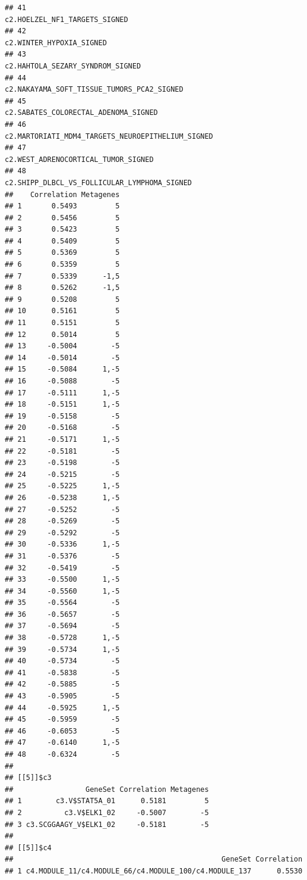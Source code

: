 \documentclass{article}\usepackage[]{graphicx}\usepackage[]{color}
\makeatletter
\newenvironment{kframe}{%
 \def\at@end@of@kframe{}%
 \ifinner\ifhmode%
  \def\at@end@of@kframe{\end{minipage}}%
  \begin{minipage}{\columnwidth}%
 \fi\fi%
 \def\FrameCommand##1{\hskip\@totalleftmargin \hskip-\fboxsep
 \colorbox{shadecolor}{##1}\hskip-\fboxsep
     \hskip-\linewidth \hskip-\@totalleftmargin \hskip\columnwidth}%
 \MakeFramed {\advance\hsize-\width
   \@totalleftmargin\z@ \linewidth\hsize
   \@setminipage}}%
 {\par\unskip\endMakeFramed%
 \at@end@of@kframe}
\newenvironment{knitrout}{}{} %
\makeatother
\begin{document}
\begin{knitrout}
\begin{kframe}
\begin{verbatim}
## 41                                                                               c2.HOELZEL_NF1_TARGETS_SIGNED
## 42                                                                                    c2.WINTER_HYPOXIA_SIGNED
## 43                                                                            c2.HAHTOLA_SEZARY_SYNDROM_SIGNED
## 44                                                                  c2.NAKAYAMA_SOFT_TISSUE_TUMORS_PCA2_SIGNED
## 45                                                                        c2.SABATES_COLORECTAL_ADENOMA_SIGNED
## 46                                                           c2.MARTORIATI_MDM4_TARGETS_NEUROEPITHELIUM_SIGNED
## 47                                                                         c2.WEST_ADRENOCORTICAL_TUMOR_SIGNED
## 48                                                                c2.SHIPP_DLBCL_VS_FOLLICULAR_LYMPHOMA_SIGNED
##    Correlation Metagenes
## 1       0.5493         5
## 2       0.5456         5
## 3       0.5423         5
## 4       0.5409         5
## 5       0.5369         5
## 6       0.5359         5
## 7       0.5339      -1,5
## 8       0.5262      -1,5
## 9       0.5208         5
## 10      0.5161         5
## 11      0.5151         5
## 12      0.5014         5
## 13     -0.5004        -5
## 14     -0.5014        -5
## 15     -0.5084      1,-5
## 16     -0.5088        -5
## 17     -0.5111      1,-5
## 18     -0.5151      1,-5
## 19     -0.5158        -5
## 20     -0.5168        -5
## 21     -0.5171      1,-5
## 22     -0.5181        -5
## 23     -0.5198        -5
## 24     -0.5215        -5
## 25     -0.5225      1,-5
## 26     -0.5238      1,-5
## 27     -0.5252        -5
## 28     -0.5269        -5
## 29     -0.5292        -5
## 30     -0.5336      1,-5
## 31     -0.5376        -5
## 32     -0.5419        -5
## 33     -0.5500      1,-5
## 34     -0.5560      1,-5
## 35     -0.5564        -5
## 36     -0.5657        -5
## 37     -0.5694        -5
## 38     -0.5728      1,-5
## 39     -0.5734      1,-5
## 40     -0.5734        -5
## 41     -0.5838        -5
## 42     -0.5885        -5
## 43     -0.5905        -5
## 44     -0.5925      1,-5
## 45     -0.5959        -5
## 46     -0.6053        -5
## 47     -0.6140      1,-5
## 48     -0.6324        -5
## 
## [[5]]$c3
##                 GeneSet Correlation Metagenes
## 1        c3.V$STAT5A_01      0.5181         5
## 2          c3.V$ELK1_02     -0.5007        -5
## 3 c3.SCGGAAGY_V$ELK1_02     -0.5181        -5
## 
## [[5]]$c4
##                                                 GeneSet Correlation
## 1 c4.MODULE_11/c4.MODULE_66/c4.MODULE_100/c4.MODULE_137      0.5530

\end{verbatim}
\end{kframe}
\end{knitrout}
\end{document}
